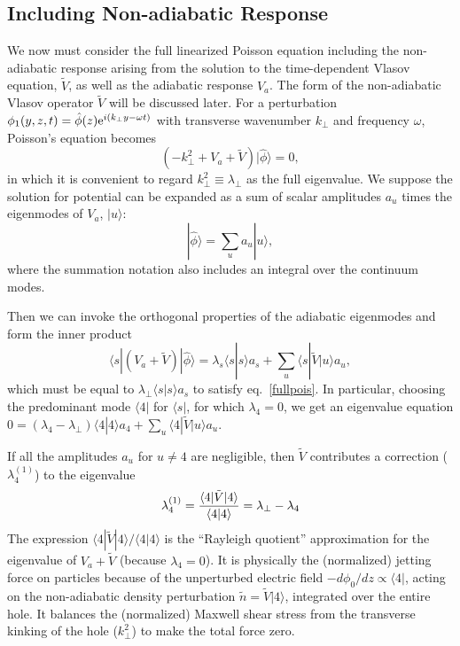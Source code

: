 \documentclass{jpp}
\def\ket#1{|#1\rangle}
\def\bra#1{\langle#1}
\begin{document}
\subsection{Including Non-adiabatic Response}
We now must consider the full linearized Poisson equation including the
non-adiabatic response arising from the solution to the time-dependent
Vlasov equation, $\tilde{V}$, as well as the adiabatic response
$V_a$. The form of the non-adiabatic Vlasov operator $\tilde{V}$ will
be discussed later. For a perturbation
$\phi_1(y,z,t)=\hat\phi(z){\rm e}^{i(k_\perp y-\omega t)}$ with
transverse wavenumber $k_\perp$ and frequency $\omega$, Poisson's
equation becomes
\begin{equation}
  \label{fullpois}
  (-k_\perp^2+V_a+\tilde{V})\ket{\hat\phi}=0,
\end{equation}
in which it is convenient to regard $k_\perp^2\equiv\lambda_\perp$ as
the full eigenvalue.  We suppose the solution for potential can be
expanded as a sum of scalar amplitudes $a_u$ times the eigenmodes of
$V_a$, $\ket{u}$:
\begin{equation}
  \label{ketphi}
  \ket{\hat\phi}=\sum_u a_u \ket{u},
\end{equation}
where the summation notation also includes an integral over the
continuum modes.

Then we can invoke the orthogonal properties of the
adiabatic eigenmodes and form the inner product
\begin{equation}
  \label{VaVt}
  \bra{s}|(%
  V_a+\tilde{V})\ket{\hat\phi}
  = %
  \lambda_s\bra{s}\ket{s}a_s+\sum_u\bra{s}|\tilde{V}\ket{u}a_u,
\end{equation}
which must be equal to $\lambda_\perp\bra{s}\ket{s}a_s$ to satisfy eq.\ \ref{fullpois}.
In particular, choosing the predominant mode $\bra{4}|$ for
$\bra{s}|$, for which $\lambda_4=0$, we get an eigenvalue equation
$0=(\lambda_4-\lambda_\perp)\bra{4}\ket{4}a_4+\sum_u\bra{4}|\tilde{V}\ket{u}a_u$.

If all the amplitudes $a_u$ for $u\not=4$ are negligible, then
$\tilde{V}$ contributes a correction ($\lambda_{4}^{(1)}$) to the eigenvalue
\begin{equation}
  \label{lam41}
  \lambda_{4}^{(1)}= {\bra{4}|\tilde{V}\ket{4}\over\bra{4}\ket{4}}=\lambda_\perp-\lambda_4
\end{equation}
The expression $\bra{4}|\tilde{V}\ket{4}/\bra{4}\ket{4}$ is the ``Rayleigh
quotient'' approximation for the eigenvalue of $V_a+\tilde{V}$
(because $\lambda_4=0$). It is
physically the (normalized) jetting force on particles because of the
unperturbed electric field $-d\phi_0/dz\propto\bra{4}|$, acting on the
non-adiabatic density perturbation $\tilde n = \tilde{V}\ket{4}$, integrated
over the entire hole. It balances the (normalized) Maxwell shear
stress from the transverse kinking of the hole ($k_\perp^2$) to
make the total force zero.
\end{document}
